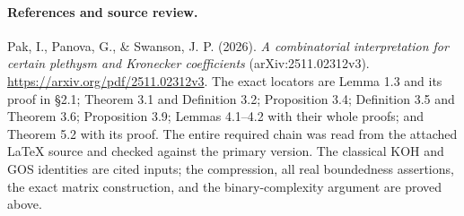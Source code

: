 \paragraph{References and source review.}
Pak, I., Panova, G., \& Swanson, J. P. (2026).
\emph{A combinatorial interpretation for certain plethysm
and Kronecker coefficients} (arXiv:2511.02312v3).
\url{https://arxiv.org/pdf/2511.02312v3}.
The exact locators are Lemma 1.3 and its proof in \S2.1;
Theorem 3.1 and Definition 3.2; Proposition 3.4;
Definition 3.5 and Theorem 3.6; Proposition 3.9;
Lemmas 4.1--4.2 with their whole proofs; and Theorem 5.2
with its proof.  The entire required chain was read from
the attached LaTeX source and checked against the primary
version.  The classical KOH and GOS identities are cited
inputs; the compression, all real boundedness assertions,
the exact matrix construction, and the binary-complexity
argument are proved above.
